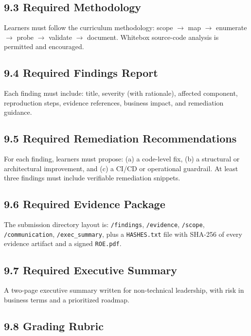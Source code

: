 \documentclass[11pt,letterpaper,oneside]{report}
\newcommand{\tool}[1]{\texttt{\small #1}}
\begin{document}
\subsection*{9.3 Required Methodology}
Learners must follow the curriculum methodology: scope $\to$ map $\to$ enumerate $\to$ probe $\to$ validate $\to$ document. Whitebox source-code analysis is permitted and encouraged.

\subsection*{9.4 Required Findings Report}
Each finding must include: title, severity (with rationale), affected component, reproduction steps, evidence references, business impact, and remediation guidance.

\subsection*{9.5 Required Remediation Recommendations}
For each finding, learners must propose: (a) a code-level fix, (b) a structural or architectural improvement, and (c) a CI/CD or operational guardrail. At least three findings must include verifiable remediation snippets.

\subsection*{9.6 Required Evidence Package}
The submission directory layout is: \tool{/findings},\allowbreak{} \tool{/evidence},\allowbreak{} \tool{/scope},\allowbreak{} \tool{/communication},\allowbreak{} \tool{/exec\_summary},\allowbreak{} plus a \tool{HASHES.txt} file with SHA-256 of every evidence artifact and a signed \tool{ROE.pdf}.

\subsection*{9.7 Required Executive Summary}
A two-page executive summary written for non-technical leadership, with risk in business terms and a prioritized roadmap.

\subsection*{9.8 Grading Rubric}
\end{document}
